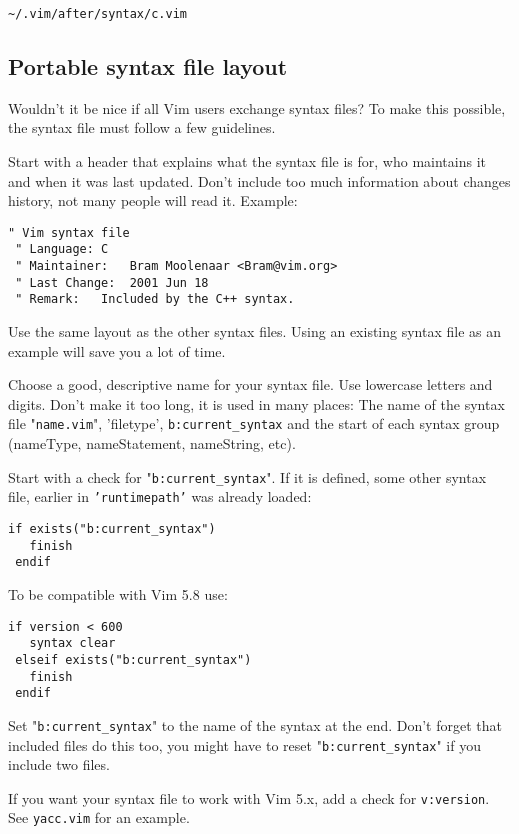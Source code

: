 \begin{Verbatim}[samepage=true]
    ~/.vim/after/syntax/c.vim 
\end{Verbatim}
\subsection{Portable syntax file layout}
Wouldn't it be nice if all Vim users exchange syntax files?  To make this possible, the syntax file must follow a few guidelines.

Start with a header that explains what the syntax file is for, who maintains it and when it was last updated.
Don't include too much information about changes history, not many people will read it.
Example:

\begin{Verbatim}[samepage=true]
 " Vim syntax file
 " Language: C
 " Maintainer:   Bram Moolenaar <Bram@vim.org>
 " Last Change:  2001 Jun 18
 " Remark:   Included by the C++ syntax.
\end{Verbatim}

Use the same layout as the other syntax files.
Using an existing syntax file as an example will save you a lot of time.

Choose a good, descriptive name for your syntax file.
Use lowercase letters and digits.
Don't make it too long, it is used in many places: The name of the syntax file "\texttt{name.vim}", 'filetype', \texttt{b:current\_syntax} and the start of each syntax group (nameType, nameStatement, nameString, etc).

Start with a check for "\texttt{b:current\_syntax}".
If it is defined, some other syntax file, earlier in \texttt{'runtimepath'} was already loaded:

\begin{Verbatim}[samepage=true]
 if exists("b:current_syntax")
   finish
 endif
\end{Verbatim}

To be compatible with Vim 5.8 use:

\begin{Verbatim}[samepage=true]
 if version < 600
   syntax clear
 elseif exists("b:current_syntax")
   finish
 endif
\end{Verbatim}

Set "\texttt{b:current\_syntax}" to the name of the syntax at the end.
Don't forget that included files do this too, you might have to reset "\texttt{b:current\_syntax}" if you include two files.

If you want your syntax file to work with Vim 5.x, add a check for \texttt{v:version}.
See \texttt{yacc.vim} for an example.


